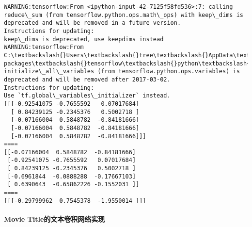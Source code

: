 \documentclass[11pt]{article}
\begin{document}
    \begin{Verbatim}[commandchars=\\\{\}]
WARNING:tensorflow:From <ipython-input-42-7125f58fd536>:7: calling reduce\_sum (from tensorflow.python.ops.math\_ops) with keep\_dims is deprecated and will be removed in a future version.
Instructions for updating:
keep\_dims is deprecated, use keepdims instead
WARNING:tensorflow:From C:\textbackslash{}Users\textbackslash{}tree\textbackslash{}AppData\textbackslash{}Local\textbackslash{}conda\textbackslash{}conda\textbackslash{}envs\textbackslash{}tensorflow\textbackslash{}lib\textbackslash{}site-packages\textbackslash{}tensorflow\textbackslash{}python\textbackslash{}util\textbackslash{}tf\_should\_use.py:118: initialize\_all\_variables (from tensorflow.python.ops.variables) is deprecated and will be removed after 2017-03-02.
Instructions for updating:
Use `tf.global\_variables\_initializer` instead.
[[[-0.92541075 -0.7655592   0.07017684]
  [ 0.84239125 -0.2345376   0.5002718 ]
  [-0.07166004  0.5848782  -0.84181666]
  [-0.07166004  0.5848782  -0.84181666]
  [-0.07166004  0.5848782  -0.84181666]]]
====
[[-0.07166004  0.5848782  -0.84181666]
 [-0.92541075 -0.7655592   0.07017684]
 [ 0.84239125 -0.2345376   0.5002718 ]
 [-0.6961844  -0.0888288  -0.17667103]
 [ 0.6390643  -0.65862226 -0.1552031 ]]
====
[[[-0.29799962  0.7545378  -1.9550014 ]]]

    \end{Verbatim}

    \paragraph{Movie
Title的文本卷积网络实现}\label{movie-titleux7684ux6587ux672cux5377ux79efux7f51ux7edcux5b9eux73b0}
\end{document}
